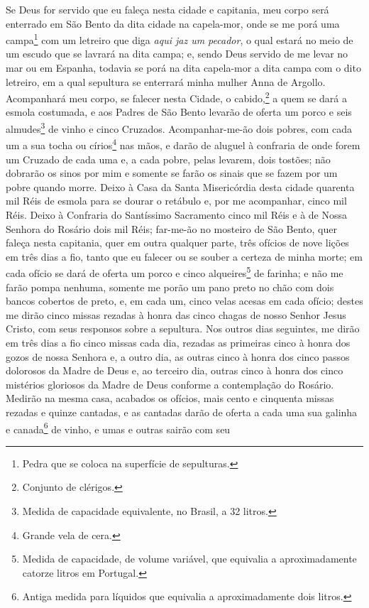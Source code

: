 Se Deus for servido que eu faleça nesta cidade e capitania, meu corpo
será enterrado em São Bento da dita cidade na capela-mor, onde se me
porá uma campa\footnote{ Pedra que se coloca na superfície de
sepulturas.} com um letreiro que diga \textit{aqui jaz um pecador}, o
qual estará no meio de um escudo que se lavrará na dita campa; e, sendo
Deus servido de me levar no mar ou em Espanha, todavia se porá na dita
capela-mor a dita campa com o dito letreiro, em a qual sepultura se
enterrará minha mulher Anna de Argollo. Acompanhará meu corpo, se
falecer nesta Cidade, o cabido,\footnote{ Conjunto de clérigos.} a quem
se dará a esmola costumada, e aos Padres de São Bento levarão de oferta
um porco e seis almudes\footnote{ Medida de capacidade equivalente, no
Brasil, a 32 litros.} de vinho e cinco Cruzados. Acompanhar-me-ão dois
pobres, com cada um a sua tocha ou círios\footnote{ Grande vela de
cera.} nas mãos, e darão de aluguel à confraria de onde forem um
Cruzado de cada uma e, a cada pobre, pelas levarem, dois tostões; não
dobrarão os sinos por mim e somente se farão os sinais que se fazem por
um pobre quando morre. Deixo à Casa da Santa Misericórdia desta cidade
quarenta mil Réis de esmola para se dourar o retábulo e, por me
acompanhar, cinco mil Réis. Deixo à Confraria do Santíssimo Sacramento
cinco mil Réis e à de Nossa Senhora do Rosário dois mil Réis; far-me-ão
no mosteiro de São Bento, quer faleça nesta capitania, quer em outra
qualquer parte, três ofícios de nove lições em três dias a fio, tanto
que eu falecer ou se souber a certeza de minha morte; em cada ofício se
dará de oferta um porco e cinco alqueires\footnote{ Medida de
capacidade, de volume variável, que equivalia a aproximadamente catorze
litros em Portugal.} de farinha; e não me farão pompa nenhuma, somente
me porão um pano preto no chão com dois bancos cobertos de preto, e, em
cada um, cinco velas acesas em cada ofício; destes me dirão cinco
missas rezadas à honra das cinco chagas de nosso Senhor Jesus Cristo,
com seus responsos sobre a sepultura. Nos outros dias seguintes, me
dirão em três dias a fio cinco missas cada dia, rezadas as primeiras
cinco à honra dos gozos de nossa Senhora e, a outro dia, as outras
cinco à honra dos cinco passos dolorosos da Madre de Deus e, ao
terceiro dia, outras cinco à honra dos cinco mistérios gloriosos da
Madre de Deus conforme a contemplação do Rosário. Medirão na mesma
casa, acabados os ofícios, mais cento e cinquenta missas rezadas e
quinze cantadas, e as cantadas darão de oferta a cada uma sua galinha e
canada\footnote{ Antiga medida para líquidos que equivalia a
aproximadamente dois litros.} de vinho, e umas e outras sairão com seu
